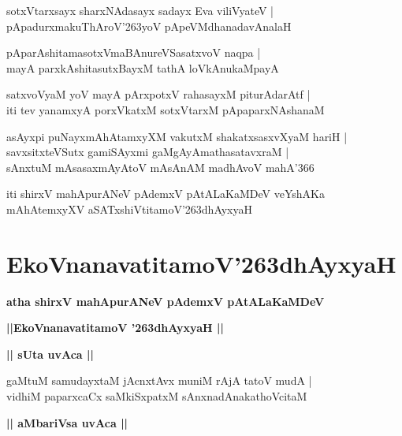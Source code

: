 \documentclass[twoside,12pt,openright]{book}
\def\S{\char'263}
\newcounter{shloka}[chapter]
\def\uvaca#1{\centerline{{\large\textbf{#1}}}}
\begin{document}
\begin{shloka}%
sotxVtarxsayx sharxNAdasayx sadayx Eva viliVyateV |\\
pApadurxmakuThAroV\S yoV pApeVMdhanadavAnalaH 
\end{shloka}

\begin{shloka}%
pAparAshitamasotxVmaBAnureVSasatxvoV naqpa |\\
mayA parxkAshitasutxBayxM tathA loVkAnukaMpayA 
\end{shloka}

\begin{shloka}%
satxvoVyaM yoV mayA pArxpotxV rahasayxM piturAdarAtf |\\
iti tev yanamxyA porxVkatxM sotxVtarxM pApaparxNAshanaM
\end{shloka}

\begin{shloka}%
asAyxpi puNayxmAhAtamxyXM vakutxM shakatxsasxvXyaM hariH |\\
savxsitxteVSutx gamiSAyxmi gaMgAyAmathasatavxraM |\\
sAnxtuM mAsasaxmAyAtoV mAsAnAM madhAvoV mahA\char'366  
\end{shloka}

\begin{center}
iti shirxV mahApurANeV pAdemxV pAtALaKaMDeV veYshAKa mAhAtemxyXV 
aSATxshiVtitamoV\S dhAyxyaH
\end{center}

\chapter{EkoVnanavatitamoV\S dhAyxyaH}

\begin{center}
{\LARGE\bfseries atha shirxV mahApurANeV pAdemxV pAtALaKaMDeV }
\end{center}

\begin{center}         
{\LARGE\bfseries ||EkoVnanavatitamoV \S dhAyxyaH ||}
\end{center}

\uvaca{|| sUta uvAca ||}

\begin{shloka}%
gaMtuM samudayxtaM jAcnxtAvx muniM rAjA tatoV mudA |\\
vidhiM paparxcaCx saMkiSxpatxM sAnxnadAnakathoVcitaM 
\end{shloka}

\uvaca{|| aMbariVsa uvAca ||}
\end{document}
